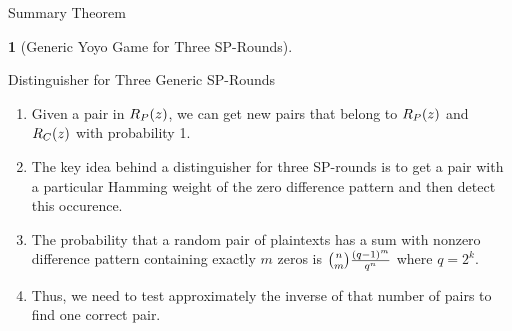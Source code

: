 \documentclass[notheorems]{beamer}
\newtheorem{theorem}{\translate{Theorem}}[section]
\newtheorem{theorem}{\translate{Theorem}}
\theoremstyle{definition}
\theoremstyle{example}
\begin{document}
    \begin{frame}{Summary Theorem}
        \begin{theorem}[Generic Yoyo Game for Three SP-Rounds]
            \label{thm:yoyo-3-rounds}
        \end{theorem}
    \end{frame}
    
    \begin{frame}{Distinguisher for Three Generic SP-Rounds}
        \begin{enumerate}
            \item<1-> Given a pair in \(R_P(z)\), we can get new pairs that
            belong to \(R_P(z)\) and \(R_C(z)\) with probability 1. 
            \item<2-> The key idea behind a distinguisher for three SP-rounds is
            to get a pair with a particular Hamming weight of the zero
            difference pattern and then detect this occurence. 
            \item<3-> The probability that a random pair of plaintexts has a sum
            with nonzero difference pattern containing exactly \(m\) zeros is
            \(\binom{n}{m}\frac{(q-1)^m}{q^n}\) where \(q = 2^k\). 
            \item<4-> Thus, we need to test approximately the inverse of that
            number of pairs to find one correct pair.
        \end{enumerate}
    \end{frame}
\end{document}
